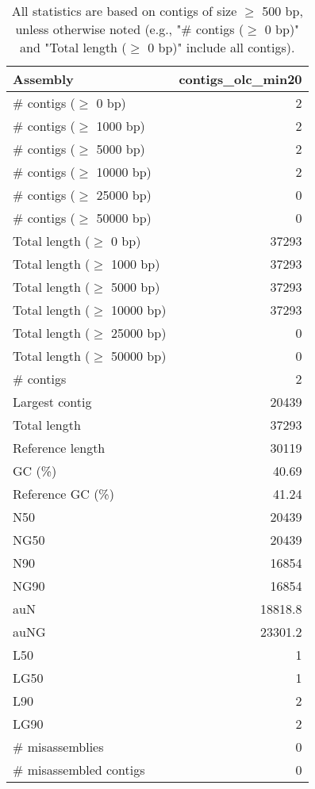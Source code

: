 \documentclass[12pt,a4paper]{article}
\begin{document}
\begin{table}[ht]
\begin{center}
\caption{All statistics are based on contigs of size $\geq$ 500 bp, unless otherwise noted (e.g., "\# contigs ($\geq$ 0 bp)" and "Total length ($\geq$ 0 bp)" include all contigs).}
\begin{tabular}{|l*{1}{|r}|}
\hline
Assembly & contigs\_olc\_min20 \\ \hline
\# contigs ($\geq$ 0 bp) & 2 \\ \hline
\# contigs ($\geq$ 1000 bp) & 2 \\ \hline
\# contigs ($\geq$ 5000 bp) & 2 \\ \hline
\# contigs ($\geq$ 10000 bp) & 2 \\ \hline
\# contigs ($\geq$ 25000 bp) & 0 \\ \hline
\# contigs ($\geq$ 50000 bp) & 0 \\ \hline
Total length ($\geq$ 0 bp) & 37293 \\ \hline
Total length ($\geq$ 1000 bp) & 37293 \\ \hline
Total length ($\geq$ 5000 bp) & 37293 \\ \hline
Total length ($\geq$ 10000 bp) & 37293 \\ \hline
Total length ($\geq$ 25000 bp) & 0 \\ \hline
Total length ($\geq$ 50000 bp) & 0 \\ \hline
\# contigs & 2 \\ \hline
Largest contig & 20439 \\ \hline
Total length & 37293 \\ \hline
Reference length & 30119 \\ \hline
GC (\%) & 40.69 \\ \hline
Reference GC (\%) & 41.24 \\ \hline
N50 & 20439 \\ \hline
NG50 & 20439 \\ \hline
N90 & 16854 \\ \hline
NG90 & 16854 \\ \hline
auN & 18818.8 \\ \hline
auNG & 23301.2 \\ \hline
L50 & 1 \\ \hline
LG50 & 1 \\ \hline
L90 & 2 \\ \hline
LG90 & 2 \\ \hline
\# misassemblies & 0 \\ \hline
\# misassembled contigs & 0 \\ \hline

\end{tabular}
\end{center}
\end{table}
\end{document}
